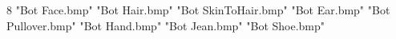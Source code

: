 8
"Bot Face.bmp"
"Bot Hair.bmp"
"Bot SkinToHair.bmp"
"Bot Ear.bmp"
"Bot Pullover.bmp"
"Bot Hand.bmp"
"Bot Jean.bmp"
"Bot Shoe.bmp"